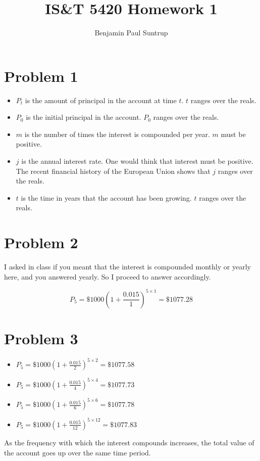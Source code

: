 \documentclass[12pt]{article}
\begin{document}
\title{IS\&T 5420 Homework 1}
\author{Benjamin Paul Suntrup}
\maketitle
	
\section*{Problem 1}
\begin{itemize}
	\item $P_t$ is the amount of principal in the account at time $t$. $t$ ranges over the reals.
	\item $P_0$ is the initial principal in the account. $P_0$ ranges over the reals.
	\item $m$ is the number of times the interest is compounded per year. $m$ must be positive.
	\item $j$ is the annual interest rate. One would think that interest must be positive. The recent financial history of the European Union shows that $j$ ranges over the reals.
	\item $t$ is the time in years that the account has been growing. $t$ ranges over the reals.
\end{itemize}

\section*{Problem 2}
I asked in class if you meant that the interest is compounded monthly or yearly here, and you answered yearly. So I proceed to answer accordingly.

$$P_5 = \$1000(1+\frac{0.015}{1})^{5\times 1} = \$1077.28$$

\section*{Problem 3}
\begin{itemize}
	\item $P_5 = \$1000(1+\frac{0.015}{2})^{5\times 2} = \$1077.58$
	\item $P_5 = \$1000(1+\frac{0.015}{4})^{5\times 4} = \$1077.73$
	\item $P_5 = \$1000(1+\frac{0.015}{6})^{5\times 6} = \$1077.78$
	\item $P_5 = \$1000(1+\frac{0.015}{12})^{5\times 12} = \$1077.83$
\end{itemize}

As the frequency with which the interest compounds increases, the total value of the account goes up over the same time period.
\end{document}
